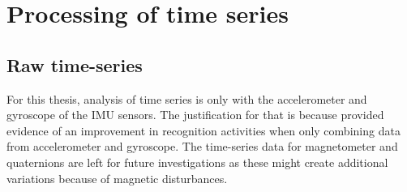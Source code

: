 
\section{Processing of time series} \label{sec:preparation_timeseries}

\subsection{Raw time-series}
For this thesis, analysis of time series is only with the accelerometer 
and gyroscope of the IMU sensors.
The justification for that is because \cite{shoaib2016} provided evidence 
of an improvement in recognition activities when only combining data 
from accelerometer and gyroscope. 
The time-series data for magnetometer and quaternions are left 
for future investigations as these might create additional variations 
because of magnetic disturbances.

